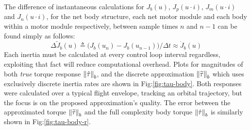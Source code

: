 \par
The difference of instantaneous calculations for $J_b(u)$, $J_p(u\cdot i)$, $J_m(u\cdot i)$ and $J_n(u\cdot i)$, for the net body structure, each net motor module and each body within a motor module respectively, between sample times $n$ and $n-1$ can be found simply as follows:
\begin{equation}\label{eq:discrete-inertia-approximation}
\Delta\widetilde{J}_b(u)\triangleq\big(J_b(u_n)-J_b(u_{n-1})\big)/\Delta t\approx\dot{J}_b(u)
\end{equation}
Each inertia must be calculated at every control loop interval regardless, exploiting that fact will reduce computational overhead. Plots for magnitudes of both \emph{true} torque response $\left\lVert\hat{\tau}\right\rVert_b$, and the discrete approximation $\left\lVert\widetilde{\tau}\right\rVert_b$ which uses exclusively discrete inertia rates are shown in Fig:\ref{fig:tau-body}. Both responses were calculated over a typical flight envelope, tracking an orbital trajectory, but the focus is on the proposed approximation's quality. The error between the approximated torque $\left\lVert\widetilde{\tau}\right\rVert_b$ and the full complexity body torque $\left\lVert\hat{\tau}\right\rVert_b$ is similarly shown in Fig:\ref{fig:tau-body-r}.
